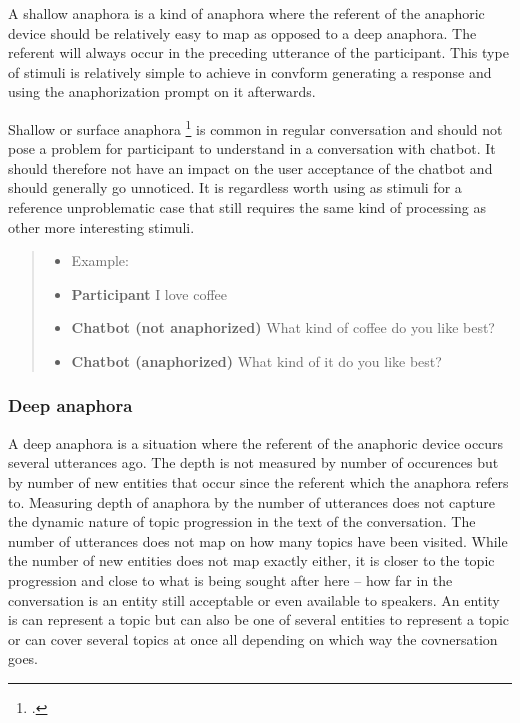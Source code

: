 \documentclass[12pt]{report}
\newcommand{\utterance}[3]{%
    \textbf{#1} #2%
    \ifx\relax#3\relax%
    \else \\ \textit{#3}%
    \fi%
}
\begin{document}
{A shallow anaphora is a kind of anaphora
where the referent of the anaphoric device
should be relatively easy to map
as opposed to a deep anaphora.
The referent will always occur
in the preceding utterance of the participant.
This type of stimuli is relatively simple to achieve
in convform
generating a response
and using the anaphorization prompt on it afterwards.

Shallow or surface anaphora \footcite{hoji2003surface} is common in regular conversation
and should not pose a problem for participant to understand
in a conversation with chatbot.
It should therefore not have an impact
on the user acceptance of the chatbot
and should generally go unnoticed.
It is regardless worth using as stimuli
for a reference unproblematic case
that still requires the same kind of processing
as other more interesting stimuli.

\begin{quote}
\begin{itemize}[label={}, leftmargin=0pt, itemsep=0.5em]
\item Example:
\item \utterance{Participant}{I love coffee}{}
\item \utterance{Chatbot (not anaphorized)}{What kind of coffee do you like best?}{}
\item \utterance{Chatbot (anaphorized)} {What kind of it do you like best?}{}
\end{itemize}
\end{quote}

\subsubsection{Deep anaphora}

A deep anaphora is a situation
where the referent of the anaphoric device
occurs several utterances ago.
The depth is not measured by number of occurences
but by number of new entities that occur
since the referent which the anaphora refers to.
Measuring depth of anaphora by the number of utterances
does not capture the dynamic nature
of topic progression in the text of the conversation.
The number of utterances does not map
on how many topics have been visited.
While the number of new entities does not
map exactly either,
it is closer to the topic progression
and close to
what is being sought after here –
how far in the conversation is an entity
still acceptable or even available to speakers.
An entity is can represent a topic
but can also be one of several entities to represent a topic
or can cover several topics at once
all depending on which way the covnersation goes.

}
\end{document}
